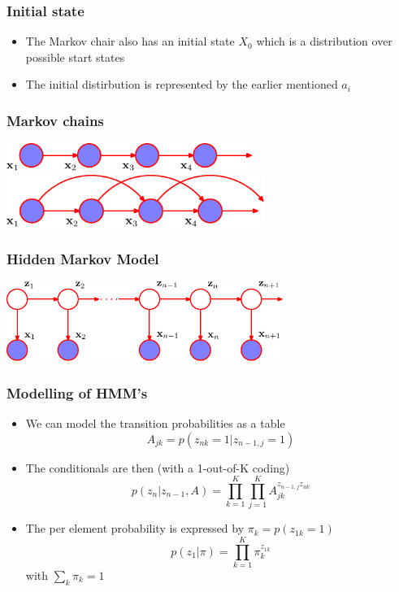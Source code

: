 \documentclass[10pt]{beamer}
\begin{document}
\begin{frame}
  \frametitle{Initial state}
  \begin{itemize}
  \item The Markov chair also has an initial state $X_0$ which is a
    distribution over possible start states
  \item The initial distirbution is represented by the earlier mentioned $a_i$
  \end{itemize}
\end{frame}


\begin{frame}
  \frametitle{Markov chains}
  \begin{center}
    \includegraphics[width=8cm]{prml-Figure13-3}\\[2cm]

    \includegraphics[width=8.4cm]{prml-Figure13-4}
  \end{center}
\end{frame}


\begin{frame}
  \frametitle{Hidden Markov Model}
  \begin{center}
    \includegraphics[width=9cm]{prml-Figure13-5}
  \end{center}
\end{frame}



\begin{frame}
  \frametitle{Modelling of HMM's}
  \begin{itemize}
  \item We can model the transition probabilities as a table
    \[
    A_{jk} = p(z_{nk} = 1 | z_{n-1,j} = 1)
    \]
  \item The conditionals are then (with a 1-out-of-K coding)
    \[
    p(z_n|z_{n-1},A) = \prod_{k=1}^K\prod_{j=1}^K A_{jk}^{z_{n-1,j} z_{nk}}
    \]
  \item The per element probability is expressed by $\pi_k =
    p(z_{1k}=1)$
    \[
    p(z_1 | \pi) = \prod_{k=1}^K \pi_k^{z_{1k}}
    \] with $\sum_k \pi_k = 1$
  \end{itemize}
\end{frame}
\end{document}
